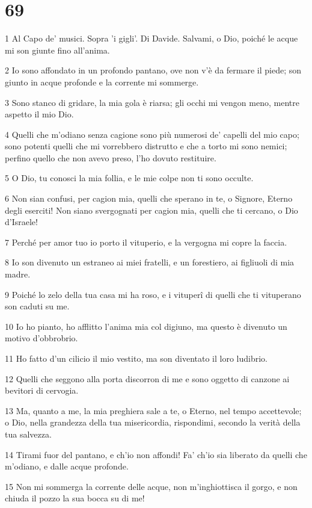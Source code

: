 \chapter{69}

\par 1 Al Capo de' musici. Sopra 'i gigli'. Di Davide. Salvami, o Dio, poiché le acque mi son giunte fino all'anima.
\par 2 Io sono affondato in un profondo pantano, ove non v'è da fermare il piede; son giunto in acque profonde e la corrente mi sommerge.
\par 3 Sono stanco di gridare, la mia gola è riarsa; gli occhi mi vengon meno, mentre aspetto il mio Dio.
\par 4 Quelli che m'odiano senza cagione sono più numerosi de' capelli del mio capo; sono potenti quelli che mi vorrebbero distrutto e che a torto mi sono nemici; perfino quello che non avevo preso, l'ho dovuto restituire.
\par 5 O Dio, tu conosci la mia follia, e le mie colpe non ti sono occulte.
\par 6 Non sian confusi, per cagion mia, quelli che sperano in te, o Signore, Eterno degli eserciti! Non siano svergognati per cagion mia, quelli che ti cercano, o Dio d'Israele!
\par 7 Perché per amor tuo io porto il vituperio, e la vergogna mi copre la faccia.
\par 8 Io son divenuto un estraneo ai miei fratelli, e un forestiero, ai figliuoli di mia madre.
\par 9 Poiché lo zelo della tua casa mi ha roso, e i vituperî di quelli che ti vituperano son caduti su me.
\par 10 Io ho pianto, ho afflitto l'anima mia col digiuno, ma questo è divenuto un motivo d'obbrobrio.
\par 11 Ho fatto d'un cilicio il mio vestito, ma son diventato il loro ludibrio.
\par 12 Quelli che seggono alla porta discorron di me e sono oggetto di canzone ai bevitori di cervogia.
\par 13 Ma, quanto a me, la mia preghiera sale a te, o Eterno, nel tempo accettevole; o Dio, nella grandezza della tua misericordia, rispondimi, secondo la verità della tua salvezza.
\par 14 Tirami fuor del pantano, e ch'io non affondi! Fa' ch'io sia liberato da quelli che m'odiano, e dalle acque profonde.
\par 15 Non mi sommerga la corrente delle acque, non m'inghiottisca il gorgo, e non chiuda il pozzo la sua bocca su di me!
